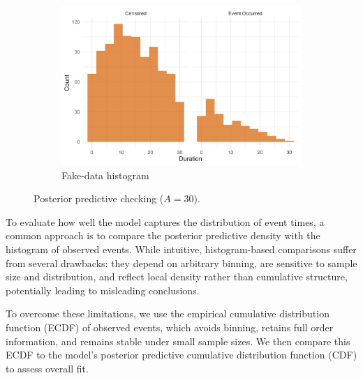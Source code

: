 \begin{figure}[htbp]
\begin{subfigure}[t]{0.35\textwidth}
  \centering
  \includegraphics[width=\linewidth]{images/fake_duration_hist_a30.png}   %
  \caption{Fake-data histogram}
  \label{fig:fake-hist}
\end{subfigure}
\caption{Posterior predictive checking ($A=30$).}
\label{fig:ppc-3in1}
\end{figure}




To evaluate how well the model captures the distribution of event times, a common approach is to compare the posterior predictive density with the histogram of observed events. While intuitive, histogram-based comparisons suffer from several drawbacks: they depend on arbitrary binning, are sensitive to sample size and distribution, and reflect local density rather than cumulative structure, potentially leading to misleading conclusions.

To overcome these limitations, we use the empirical cumulative distribution function (ECDF) of observed events, which avoids binning, retains full order information, and remains stable under small sample sizes. We then compare this ECDF to the model’s posterior predictive cumulative distribution function (CDF) to assess overall fit.


